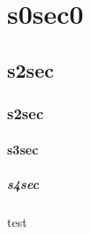 \section{s0sec0}
\subsection{s2sec}
\subsubsection{s2sec}
\paragraph{s3sec}
\subparagraph{s4sec}

test


